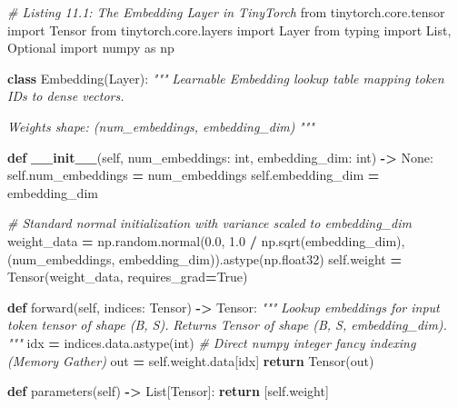 \documentclass[
  letterpaper,
]{scrbook}
\newenvironment{Shaded}{\begin{snugshade}}{\end{snugshade}}
\newcommand{\BuiltInTok}[1]{#1}
\newcommand{\CommentTok}[1]{\textcolor[rgb]{0.56,0.35,0.01}{\textit{#1}}}
\newcommand{\ControlFlowTok}[1]{\textcolor[rgb]{0.13,0.29,0.53}{\textbf{#1}}}
\newcommand{\FloatTok}[1]{\textcolor[rgb]{0.00,0.00,0.81}{#1}}
\newcommand{\FunctionTok}[1]{\textcolor[rgb]{0.13,0.29,0.53}{\textbf{#1}}}
\newcommand{\ImportTok}[1]{#1}
\newcommand{\KeywordTok}[1]{\textcolor[rgb]{0.13,0.29,0.53}{\textbf{#1}}}
\newcommand{\NormalTok}[1]{#1}
\newcommand{\OperatorTok}[1]{\textcolor[rgb]{0.81,0.36,0.00}{\textbf{#1}}}
\newcommand{\VariableTok}[1]{\textcolor[rgb]{0.00,0.00,0.00}{#1}}
\begin{document}
\begin{Shaded}
\begin{Highlighting}[]
\CommentTok{\# Listing 11.1: The Embedding Layer in TinyTorch}
\ImportTok{from}\NormalTok{ tinytorch.core.tensor }\ImportTok{import}\NormalTok{ Tensor}
\ImportTok{from}\NormalTok{ tinytorch.core.layers }\ImportTok{import}\NormalTok{ Layer}
\ImportTok{from}\NormalTok{ typing }\ImportTok{import}\NormalTok{ List, Optional}
\ImportTok{import}\NormalTok{ numpy }\ImportTok{as}\NormalTok{ np}

\KeywordTok{class}\NormalTok{ Embedding(Layer):}
    \CommentTok{"""}
\CommentTok{    Learnable Embedding lookup table mapping token IDs to dense vectors.}

\CommentTok{    Weights shape: (num\_embeddings, embedding\_dim)}
\CommentTok{    """}

    \KeywordTok{def} \FunctionTok{\_\_init\_\_}\NormalTok{(}\VariableTok{self}\NormalTok{, num\_embeddings: }\BuiltInTok{int}\NormalTok{, embedding\_dim: }\BuiltInTok{int}\NormalTok{) }\OperatorTok{{-}\textgreater{}} \VariableTok{None}\NormalTok{:}
        \VariableTok{self}\NormalTok{.num\_embeddings }\OperatorTok{=}\NormalTok{ num\_embeddings}
        \VariableTok{self}\NormalTok{.embedding\_dim }\OperatorTok{=}\NormalTok{ embedding\_dim}

        \CommentTok{\# Standard normal initialization with variance scaled to embedding\_dim}
\NormalTok{        weight\_data }\OperatorTok{=}\NormalTok{ np.random.normal(}\FloatTok{0.0}\NormalTok{, }\FloatTok{1.0} \OperatorTok{/}\NormalTok{ np.sqrt(embedding\_dim), (num\_embeddings, embedding\_dim)).astype(np.float32)}
        \VariableTok{self}\NormalTok{.weight }\OperatorTok{=}\NormalTok{ Tensor(weight\_data, requires\_grad}\OperatorTok{=}\VariableTok{True}\NormalTok{)}

    \KeywordTok{def}\NormalTok{ forward(}\VariableTok{self}\NormalTok{, indices: Tensor) }\OperatorTok{{-}\textgreater{}}\NormalTok{ Tensor:}
        \CommentTok{"""}
\CommentTok{        Lookup embeddings for input token tensor of shape (B, S).}
\CommentTok{        Returns Tensor of shape (B, S, embedding\_dim).}
\CommentTok{        """}
\NormalTok{        idx }\OperatorTok{=}\NormalTok{ indices.data.astype(}\BuiltInTok{int}\NormalTok{)}
        \CommentTok{\# Direct numpy integer fancy indexing (Memory Gather)}
\NormalTok{        out }\OperatorTok{=} \VariableTok{self}\NormalTok{.weight.data[idx]}
        \ControlFlowTok{return}\NormalTok{ Tensor(out)}

    \KeywordTok{def}\NormalTok{ parameters(}\VariableTok{self}\NormalTok{) }\OperatorTok{{-}\textgreater{}}\NormalTok{ List[Tensor]:}
        \ControlFlowTok{return}\NormalTok{ [}\VariableTok{self}\NormalTok{.weight]}
\end{Highlighting}
\end{Shaded}
\end{document}

